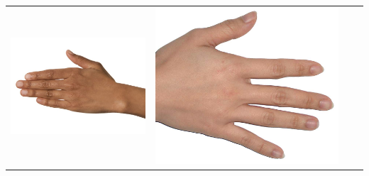 \begin{longtable}{|N||c|c|c|}
\begin{minipage}{.29\textwidth}
    \includegraphics[width=\textwidth,height=\textheight,keepaspectratio]{../inputs/hand_brown.jpg}
  \end{minipage} & 
  \begin{minipage}{.29\textwidth}
    \includegraphics[width=\textwidth,height=\textheight,keepaspectratio]{../inputs/hand_light.jpg}
  \end{minipage} & 
  \begin{minipage}{.29\textwidth}

\end{minipage}
\end{longtable}
